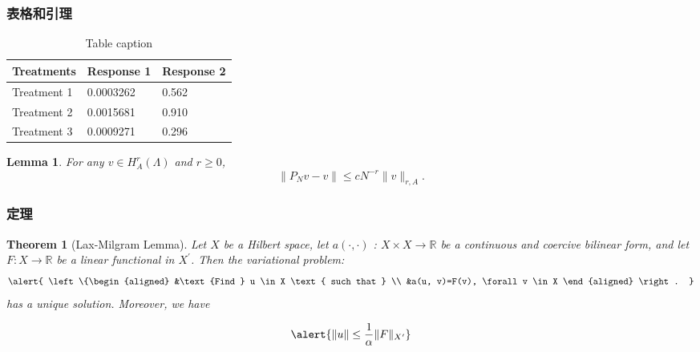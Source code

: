 \documentclass[11pt,compress]{beamer}
\newtheorem{thm}{Theorem}
\numberwithin{thm}{section}
\numberwithin{defn}{section}
\newtheorem{lmm}{Lemma}
\numberwithin{lmm}{section}
\theoremstyle{example}
\numberwithin{figure}{section}
\numberwithin{table}{section}
\numberwithin{equation}{section}
\begin{document}
\begin{frame}
\frametitle{表格和引理}
\begin{table}
\caption{Table caption}
\begin{tabular}{l l l}
\toprule
\textbf{Treatments} & \textbf{Response 1} & \textbf{Response 2}\\
\midrule
Treatment 1 & 0.0003262 & 0.562 \\
Treatment 2 & 0.0015681 & 0.910 \\
Treatment 3 & 0.0009271 & 0.296 \\
\bottomrule
\end{tabular}
\end{table}
\begin{lmm}
  For any $v \in H_{A}^{r}(\Lambda)$ and $r \geq 0$,
  \begin{equation}
    \|P_{N} v-v\| \leq c N^{-r}\|v\|_{r, A}.
  \end{equation}
\end{lmm}
\end{frame}



\begin{frame}
\frametitle{定理}

\begin{thm}[Lax-Milgram Lemma]
Let $X$ be a Hilbert space, let $a(\cdot, \cdot)$ : $X \times X \rightarrow \mathbb{R}$ be a continuous and coercive bilinear form, and let $F : X \rightarrow \mathbb{R}$ be a linear functional in $X^{\prime}$. Then the variational problem:
\begin{equation}
  \alert{
  \left\{\begin{aligned}
  &\text {Find } u \in X \text { such that } \\
  &a(u, v)=F(v), \forall v \in X
  \end{aligned} \right. }
\end{equation}
has a unique solution. Moreover, we have

\begin{equation}
  \alert{ \|u\| \leq \frac{1}{\alpha}\|F\|_{X^{\prime}}  }
\end{equation}
\end{thm}

\end{frame}

\end{document}
